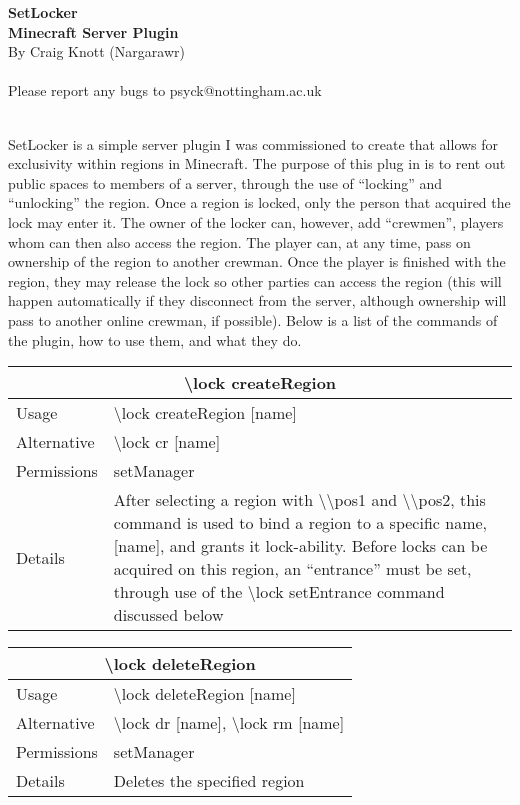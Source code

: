 \documentclass[a4paper,twoside,notitlepage,11pt]{article}
\newcommand{\nin}{\noindent}
\begin{document}
\pagestyle{empty}
\begin{center}
   \textbf{SetLocker\ \\Minecraft Server Plugin} \ \\
   By Craig Knott (Nargarawr) \ \\
   \ \\
   Please report any bugs to psyck@nottingham.ac.uk
\end{center}
\ \\
\nin
SetLocker is a simple server plugin I was commissioned to create that allows for exclusivity within regions in Minecraft. The purpose of this plug in is to rent out public spaces to members of a server, through the use of ``locking'' and ``unlocking'' the region. Once a region is locked, only the person that acquired the lock may enter it. The owner of the locker can, however, add ``crewmen'', players whom can then also access the region. The player can, at any time, pass on ownership of the region to another crewman. Once the player is finished with the region, they may release the lock so other parties can access the region (this will happen automatically if they disconnect from the server, although ownership will pass to another online crewman, if possible). Below is a list of the commands of the plugin, how to use them, and what they do.

\begin{center}
\begin{tabular}{|p{2cm}|p{12.5cm}|} \hline
\multicolumn{2}{|c|}{\textbf{\textbackslash lock createRegion}} \\ \hline
Usage       & \textbackslash lock createRegion [name] \\ \hline
Alternative & \textbackslash lock cr [name] \\ \hline
Permissions & setManager \\ \hline
Details 	& After selecting a region with \textbackslash\textbackslash pos1 and \textbackslash\textbackslash pos2, this command is used to bind a region to a specific name, [name], and grants it lock-ability. Before locks can be acquired on this region, an ``entrance'' must be set, through use of the \textbackslash lock setEntrance command discussed below\\ \hline
\end{tabular}
\end{center}

\begin{center}
\begin{tabular}{|p{2cm}|p{12.5cm}|} \hline
\multicolumn{2}{|c|}{\textbf{\textbackslash lock deleteRegion}} \\ \hline
Usage       & \textbackslash lock deleteRegion [name] \\ \hline
Alternative & \textbackslash lock dr [name], \textbackslash lock rm [name] \\ \hline
Permissions & setManager \\ \hline
Details 	& Deletes the specified region \\ \hline
\end{tabular}
\end{center}
\end{document}
